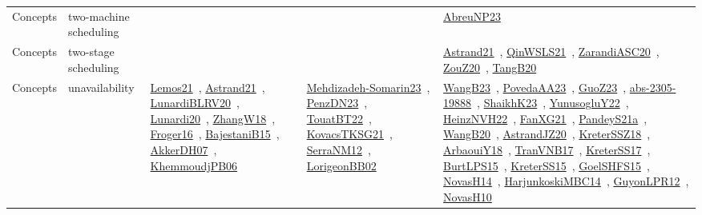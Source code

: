 {\begin{longtable}{lp{3cm}>{\raggedright\arraybackslash}p{6cm}>{\raggedright\arraybackslash}p{6cm}>{\raggedright\arraybackslash}p{8cm}}
Concepts & two-machine scheduling &  &  & \href{../works/AbreuNP23.pdf}{AbreuNP23}~\cite{AbreuNP23}\\
Concepts & two-stage scheduling &  &  & \href{../works/Astrand21.pdf}{Astrand21}~\cite{Astrand21}, \href{../works/QinWSLS21.pdf}{QinWSLS21}~\cite{QinWSLS21}, \href{../works/ZarandiASC20.pdf}{ZarandiASC20}~\cite{ZarandiASC20}, \href{../works/ZouZ20.pdf}{ZouZ20}~\cite{ZouZ20}, \href{../works/TangB20.pdf}{TangB20}~\cite{TangB20}\\
Concepts & unavailability & \href{../works/Lemos21.pdf}{Lemos21}~\cite{Lemos21}, \href{../works/Astrand21.pdf}{Astrand21}~\cite{Astrand21}, \href{../works/LunardiBLRV20.pdf}{LunardiBLRV20}~\cite{LunardiBLRV20}, \href{../works/Lunardi20.pdf}{Lunardi20}~\cite{Lunardi20}, \href{../works/ZhangW18.pdf}{ZhangW18}~\cite{ZhangW18}, \href{../works/Froger16.pdf}{Froger16}~\cite{Froger16}, \href{../works/BajestaniB15.pdf}{BajestaniB15}~\cite{BajestaniB15}, \href{../works/AkkerDH07.pdf}{AkkerDH07}~\cite{AkkerDH07}, \href{../works/KhemmoudjPB06.pdf}{KhemmoudjPB06}~\cite{KhemmoudjPB06} & \href{../works/Mehdizadeh-Somarin23.pdf}{Mehdizadeh-Somarin23}~\cite{Mehdizadeh-Somarin23}, \href{../works/PenzDN23.pdf}{PenzDN23}~\cite{PenzDN23}, \href{../works/TouatBT22.pdf}{TouatBT22}~\cite{TouatBT22}, \href{../works/KovacsTKSG21.pdf}{KovacsTKSG21}~\cite{KovacsTKSG21}, \href{../works/SerraNM12.pdf}{SerraNM12}~\cite{SerraNM12}, \href{../works/LorigeonBB02.pdf}{LorigeonBB02}~\cite{LorigeonBB02} & \href{../works/WangB23.pdf}{WangB23}~\cite{WangB23}, \href{../works/PovedaAA23.pdf}{PovedaAA23}~\cite{PovedaAA23}, \href{../works/GuoZ23.pdf}{GuoZ23}~\cite{GuoZ23}, \href{../works/abs-2305-19888.pdf}{abs-2305-19888}~\cite{abs-2305-19888}, \href{../works/ShaikhK23.pdf}{ShaikhK23}~\cite{ShaikhK23}, \href{../works/YunusogluY22.pdf}{YunusogluY22}~\cite{YunusogluY22}, \href{../works/HeinzNVH22.pdf}{HeinzNVH22}~\cite{HeinzNVH22}, \href{../works/FanXG21.pdf}{FanXG21}~\cite{FanXG21}, \href{../works/PandeyS21a.pdf}{PandeyS21a}~\cite{PandeyS21a}, \href{../works/WangB20.pdf}{WangB20}~\cite{WangB20}, \href{../works/AstrandJZ20.pdf}{AstrandJZ20}~\cite{AstrandJZ20}, \href{../works/KreterSSZ18.pdf}{KreterSSZ18}~\cite{KreterSSZ18}, \href{../works/ArbaouiY18.pdf}{ArbaouiY18}~\cite{ArbaouiY18}, \href{../works/TranVNB17.pdf}{TranVNB17}~\cite{TranVNB17}, \href{../works/KreterSS17.pdf}{KreterSS17}~\cite{KreterSS17}, \href{../works/BurtLPS15.pdf}{BurtLPS15}~\cite{BurtLPS15}, \href{../works/KreterSS15.pdf}{KreterSS15}~\cite{KreterSS15}, \href{../works/GoelSHFS15.pdf}{GoelSHFS15}~\cite{GoelSHFS15}, \href{../works/NovasH14.pdf}{NovasH14}~\cite{NovasH14}, \href{../works/HarjunkoskiMBC14.pdf}{HarjunkoskiMBC14}~\cite{HarjunkoskiMBC14}, \href{../works/GuyonLPR12.pdf}{GuyonLPR12}~\cite{GuyonLPR12}, \href{../works/NovasH10.pdf}{NovasH10}~\cite{NovasH10}\\
\end{longtable}
}

